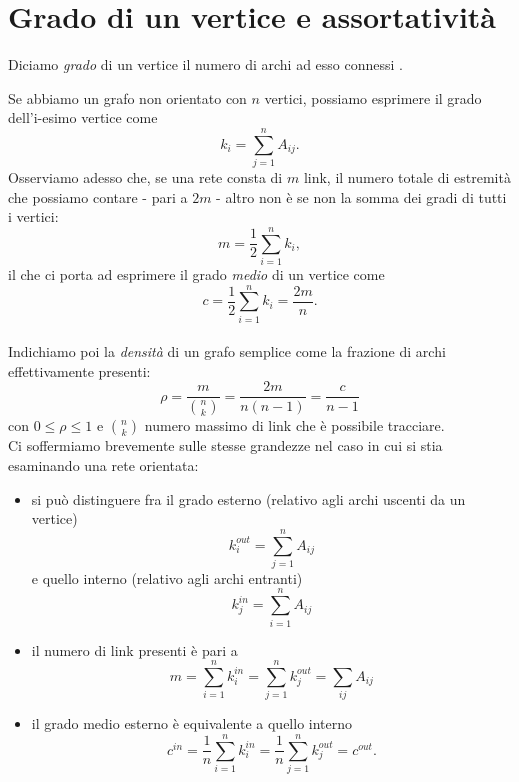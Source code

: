 \section{Grado di un vertice e assortativit\`{a}}
\begin{definizione}
Diciamo \emph{grado} di un vertice il numero di archi ad esso connessi \cite{Lesniak}.
\end{definizione}
Se abbiamo un grafo non orientato con $ n $ vertici, possiamo esprimere il grado dell'i-esimo vertice come
\begin{equation}
	k_i = \sum_{j=1}^n A_{ij}.
\end{equation}
Osserviamo adesso che, se una rete consta di $ m $ link, il numero totale di estremità che possiamo contare - pari a $ 2m $ - altro non è se non la somma dei gradi di tutti i vertici: 
\begin{equation}
	m = \frac{1}{2} \sum_{i=1}^n k_i,
\end{equation}
il che ci porta ad esprimere il grado \emph{medio} di un vertice come 
\begin{equation}
 	c = \frac{1}{2} \sum_{i=1}^n k_i = \frac{2m}{n}. 
\end{equation}
 \\Indichiamo poi la \emph{densità} di un grafo semplice come la frazione di archi effettivamente presenti:
\begin{equation}
	\rho = \frac{m}{\binom{n}{k}} = \frac{2m}{n\left(n-1 \right)} = \frac{c}{n-1}
\end{equation}
con $ 0 \leq \rho \leq  1 $ e  $ \binom{n}{k} $  numero massimo di link che è possibile tracciare. \\Ci soffermiamo brevemente sulle stesse grandezze nel caso in cui si stia esaminando una rete orientata:
\begin{itemize}
\item si può distinguere fra il grado esterno (relativo agli archi uscenti da un vertice)
	\begin{equation}
		k_{i}^{out} = \sum_{j=1}^n A_{ij}	
	\end{equation}
e quello interno (relativo agli archi entranti)
	\begin{equation}
		k_{j}^{in} = \sum_{i=1}^n A_{ij}
	\end{equation}
\item il numero di link presenti è pari a
	\begin{equation}
		m = \sum_{i=1}^n k_i^{in} = \sum_{j=1}^n k_j^{out} = \sum_{ij} A_{ij}
	\end{equation}
\item il grado medio esterno è equivalente a quello interno
	\begin{equation}
		c^{in} = \frac{1}{n} \sum_{i=1}^n k_i^{in} = \frac{1}{n} \sum_{j=1}^n k_j^{out} = c^{out}.
	\end{equation}
\end{itemize}
